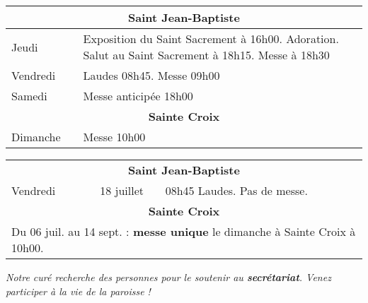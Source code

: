 \documentclass[french,11pt]{article}
\begin{document}
\begin{tabular} {lcp{9cm}}
\multicolumn{3}{c}{\textbf{Saint Jean-Baptiste} } \\ \hline
Jeudi    & &
Exposition du Saint Sacrement à 16h00. Adoration. Salut au Saint Sacrement à 18h15. Messe à 18h30 
 \\ \hline
Vendredi & & Laudes 08h45. Messe 09h00 \\ \hline
Samedi   & & Messe anticipée 18h00 \\ \hline
\multicolumn{3}{c}{\textbf{Sainte Croix} } \\ \hline
Dimanche  & & Messe 10h00\\ \hline
\end{tabular}

\begin{framed}
\begin{tabular} {lcp{8cm}}
\multicolumn{3}{c}{\textbf{Saint Jean-Baptiste} } \\
Vendredi & 18 juillet  & 08h45 Laudes. Pas de messe. \\
\multicolumn{3}{c}{\textbf{Sainte Croix} } \\
\multicolumn{3}{l}{ Du 06 juil. au 14 sept. : \textbf{messe unique} le dimanche à Sainte Croix à 10h00.} \\
\end{tabular}
\end{framed}

\emph{Notre curé recherche des personnes pour le soutenir au \textbf{secrétariat}. Venez participer à la vie de la paroisse !}
\end{document}
